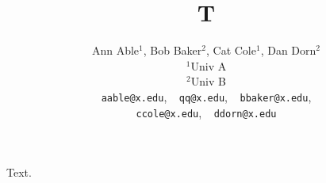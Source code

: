 \documentclass{article}
\title{T}
\author{Ann Able$^1$, Bob Baker$^2$, Cat Cole$^1$, Dan Dorn$^2$ \\ $^1$Univ A \\ $^2$Univ B \\
\texttt{aable@x.edu}, $\:\:$ \texttt{qq@x.edu}, $\:\:$ \texttt{bbaker@x.edu}, \\ \texttt{ccole@x.edu}, $\:\:$ \texttt{ddorn@x.edu}}
\begin{document}
\maketitle
Text.
\end{document}
